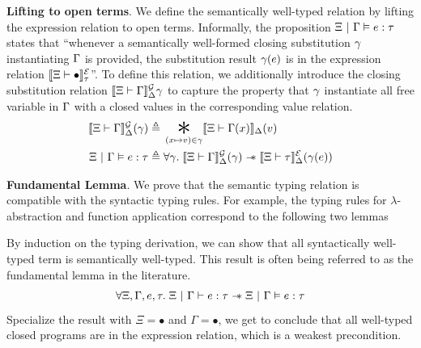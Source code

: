 \documentclass{article}
\theoremstyle{definition}
\theoremstyle{plain}
\theoremstyle{remark}
\begin{document}
\textbf{Lifting to open terms}. We define the semantically well-typed relation by lifting the expression relation to open terms.
Informally, the proposition \(\Xi ~|~ \Gamma \vDash e : \tau\) states that ``whenever a semantically well-formed closing substitution \(\gamma\) instantiating \(\Gamma\) is provided,
the substitution result \(\gamma(e)\) is in the expression relation \(\llbracket \Xi \vdash \bullet \rrbracket^{\mathcal{E}}_{\tau}{}\)''.
To define this relation, we additionally introduce the closing substitution relation \(\llbracket \Xi \vdash \Gamma \rrbracket^{\mathcal{G}}_{\Delta}{\gamma}\) to capture the property that \(\gamma\) instantiate all free variable in \(\Gamma\) with a closed values in the corresponding value relation.
\begin{align*}
  \semGtype{\Tenv}{\Env}{\semenv}(\env) \eqdef{} & \bigsep_{(\var\mapsto\val) \in \env} \semVtype{\Tenv}{\Env(\var)}{\semenv}(\val) \\
  \semtyped{\Tenv}{\Env}{\expr}{\typ} \eqdef{} & \forall \env .\; \semGtype{\Tenv}{\Env}{\semenv}(\env) \wand \semEtype{\Tenv}{\typ}{\semenv}(\env(\expr))
\end{align*}

\textbf{Fundamental Lemma}. We prove that the semantic typing relation is compatible with the syntactic typing rules.
For example, the typing rules for \(\lambda\)-abstraction and function application correspond to the following two lemmas

By induction on the typing derivation, we can show that all syntactically well-typed term is semantically well-typed.
This result is often being referred to as the fundamental lemma in the literature.
\[
  \forall \Xi,\Gamma,e,\tau .\;{\Xi ~|~ \Gamma}\vdash{e}\mathrel{:}{\tau} \mathrel{-\!\!*} \Xi ~|~ \Gamma \vDash e : \tau
\]
Specialize the result with \(\Xi = \bullet\) and \(\Gamma = \bullet\), we get to conclude that all well-typed closed programs are in the expression relation, which is a weakest precondition.\par
\end{document}
